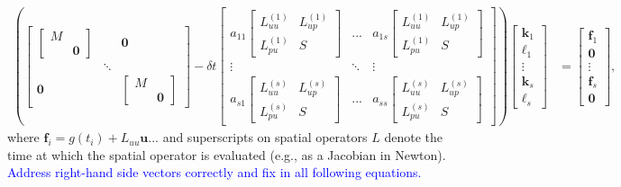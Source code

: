 \documentclass[a4paper,10pt]{article}
\newcommand{\tcb}{\textcolor{blue}}
\begin{document}
\begin{align}\label{eq:k0}
\left( \begin{bmatrix} \begin{bmatrix} M \\ & \mathbf{0}\end{bmatrix} & &
	\mathbf{0} \\ & \ddots \\ \mathbf{0} & & \begin{bmatrix} M \\ & \mathbf{0}\end{bmatrix}
		\end{bmatrix}
	- \delta t \begin{bmatrix} a_{11}\begin{bmatrix} L^{(1)}_{uu} & L^{(1)}_{up} \\ L^{(1)}_{pu} & S \end{bmatrix} & ... & a_{1s}\begin{bmatrix} L^{(1)}_{uu} & L^{(1)}_{up} \\ L^{(1)}_{pu} & S \end{bmatrix} \\
	\vdots & \ddots & \vdots \\ a_{s1}\begin{bmatrix} L^{(s)}_{uu} & L^{(s)}_{up} \\ L^{(s)}_{pu} & S \end{bmatrix} & ... & a_{ss} \begin{bmatrix} L^{(s)}_{uu} & L^{(s)}_{up} \\ L^{(s)}_{pu} & S \end{bmatrix} \end{bmatrix} \right)
	\begin{bmatrix} \mathbf{k}_1 \\ \ell_1 \\ \vdots \\ \mathbf{k}_s \\ \ell_s\end{bmatrix} 
& = \begin{bmatrix} \mathbf{f}_1 \\ \mathbf{0} \\ \vdots \\ \mathbf{f}_s \\ \mathbf{0} \end{bmatrix},
\end{align}
%
where $\mathbf{f}_i = g(t_i) + L_{uu}\mathbf{u} ...$ and superscripts on
spatial operators $L$ denote the time at which the spatial operator is
evaluated (e.g., as a Jacobian in Newton). \tcb{Address right-hand side
vectors correctly and fix in all following equations.}
\end{document}
